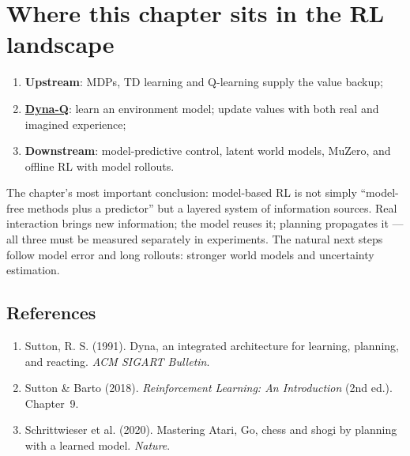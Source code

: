 \documentclass{article}
\begin{document}
\section*{Where this chapter sits in the RL landscape}

\begin{enumerate}
  \item \textbf{Upstream}: MDPs, TD learning and Q-learning supply the value backup;
  \item \underline{\textbf{Dyna-Q}}: learn an environment model; update values with both real and imagined experience;
  \item \textbf{Downstream}: model-predictive control, latent world models, MuZero, and offline RL with model rollouts.
\end{enumerate}

The chapter's most important conclusion: model-based RL is not simply ``model-free methods plus a predictor'' but a layered system of information sources. Real interaction brings new information; the model reuses it; planning propagates it --- all three must be measured separately in experiments. The natural next steps follow model error and long rollouts: stronger world models and uncertainty estimation.

\subsection*{References}

\begin{enumerate}
  \item Sutton, R. S. (1991). Dyna, an integrated architecture for learning, planning, and reacting. \textit{ACM SIGART Bulletin}.
  \item Sutton \& Barto (2018). \textit{Reinforcement Learning: An Introduction} (2nd ed.). Chapter~9.
  \item Schrittwieser et al. (2020). Mastering Atari, Go, chess and shogi by planning with a learned model. \textit{Nature}.
\end{enumerate}
\end{document}
